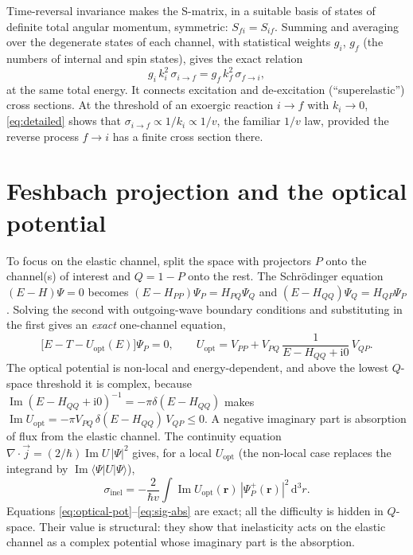 \documentclass[11pt,a4paper]{book}
\numberwithin{equation}{chapter}
\newcommand{\dd}{\mathrm{d}}
\newcommand{\ii}{\mathrm{i}}
\newcommand{\vr}{\bm{r}}
\newcommand{\Imag}{\operatorname{Im}}
\begin{document}
Time-reversal invariance makes the S-matrix, in a suitable basis of states of
definite total angular momentum, symmetric: $S_{fi}=S_{if}$. Summing and averaging
over the degenerate states of each channel, with statistical weights $g_i$, $g_f$
(the numbers of internal and spin states), gives the exact relation
\begin{equation}\label{eq:detailed}
  g_i\,k_i^2\,\sigma_{i\to f}=g_f\,k_f^2\,\sigma_{f\to i},
\end{equation}
at the same total energy. It connects excitation and de-excitation (``superelastic'')
cross sections. At the threshold of an exoergic reaction $i\to f$ with $k_i\to0$,
\eqref{eq:detailed} shows that $\sigma_{i\to f}\propto1/k_i\propto1/v$, the
familiar $1/v$ law, provided the reverse process $f\to i$ has a finite cross
section there.

\section{Feshbach projection and the optical potential}

To focus on the elastic channel, split the space with projectors $P$ onto the
channel(s) of interest and $Q=1-P$ onto the rest. The Schr\"odinger equation
$(E-H)\Psi=0$ becomes
$(E-H_{PP})\Psi_P=H_{PQ}\Psi_Q$ and $(E-H_{QQ})\Psi_Q=H_{QP}\Psi_P$. Solving the
second with outgoing-wave boundary conditions and substituting in the first gives
an \emph{exact} one-channel equation,
\begin{equation}\label{eq:optical-pot}
  \bigl[E-T-U_{\mathrm{opt}}(E)\bigr]\Psi_P=0,\qquad
  U_{\mathrm{opt}}=V_{PP}+V_{PQ}\,\frac{1}{E-H_{QQ}+\ii0}\,V_{QP}.
\end{equation}
The optical potential is non-local and energy-dependent, and above the lowest
$Q$-space threshold it is complex, because
$\Imag(E-H_{QQ}+\ii0)^{-1}=-\pi\delta(E-H_{QQ})$ makes
$\Imag U_{\mathrm{opt}}=-\pi V_{PQ}\,\delta(E-H_{QQ})\,V_{QP}\le0$. A negative
imaginary part is absorption of flux from the elastic channel. The continuity
equation $\nabla\cdot\vec j=(2/\hbar)\Imag U\,|\Psi|^2$ gives, for a local
$U_{\mathrm{opt}}$ (the non-local case replaces the integrand by
$\Imag\langle\Psi|U|\Psi\rangle$),
\begin{equation}\label{eq:sig-abs}
  \sigma_{\mathrm{inel}}=-\frac{2}{\hbar v}\int\Imag U_{\mathrm{opt}}(\vr)\,
  |\Psi_P^+(\vr)|^2\,\dd^3r .
\end{equation}
Equations \eqref{eq:optical-pot}--\eqref{eq:sig-abs} are exact; all the difficulty
is hidden in $Q$-space. Their value is structural: they show that inelasticity acts
on the elastic channel as a complex potential whose imaginary part is the
absorption.
\end{document}
